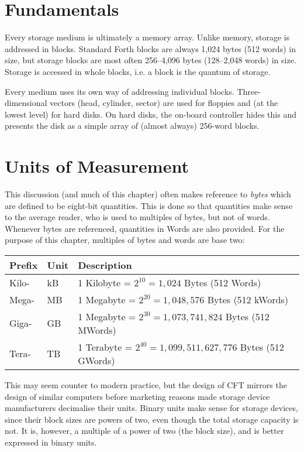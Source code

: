 \section{Fundamentals}

Every storage medium is ultimately a memory array. Unlike memory, storage is
addressed in blocks. Standard Forth blocks are always 1,024 bytes (512 words)
in size, but storage blocks are most often 256–4,096 bytes (128–2,048 words) in
size. Storage is accessed in whole blocks, i.e. a block is the quantum of
storage. 

Every medium uses its own way of addressing individual
blocks. Three-dimensional vectors (head, cylinder, sector) are used for
floppies and (at the lowest level) for hard disks. On hard disks, the on-board
controller hides this and presents the disk as a simple array of (almost
always) 256-word blocks.

\section{Units of Measurement}

This discussion (and much of this chapter) often makes reference to
{\em bytes\/} which are defined to be eight-bit quantities. This is
done so that quantities make sense to the average reader, who is used
to multiples of bytes, but not of words. Whenever bytes are
referenced, quantities in Words are also provided. For the purpose of
this chapter, multiples of bytes and words are base two:

\begin{center}
  \zebra
  \begin{tabular}{lll}
    Prefix & Unit    & Description\\\hline
    Kilo-  & kB      & 1 Kilobyte = $2^{10}=1,024$ Bytes (512 Words) \\
    Mega-  & MB      & 1 Megabyte = $2^{20}=1,048,576$ Bytes (512 kWords) \\
    Giga-  & GB      & 1 Megabyte = $2^{30}=1,073,741,824$ Bytes (512 MWords) \\
    Tera-  & TB      & 1 Terabyte = $2^{40}=1,099,511,627,776$ Bytes (512 GWords) \\
    \hline
  \end{tabular}
\end{center}%
%
\noindent This may seem counter to modern practice, but the design of
CFT mirrors the design of similar computers before marketing reasons
made storage device manufacturers decimalise their units. Binary units
make sense for storage devices, since their block sizes are powers of
two, even though the total storage capacity is not. It is, however, a
multiple of a power of two (the block size), and is better expressed
in binary units.

